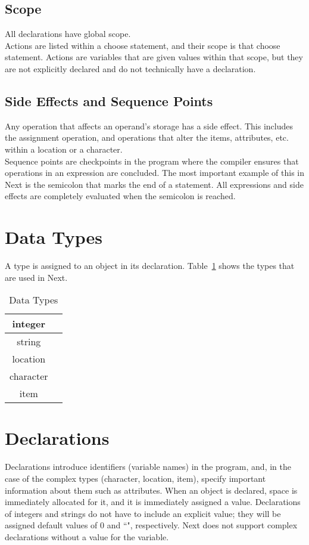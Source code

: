 \documentclass[12pt]{article}
\begin{document}
\subsection{Scope}
All declarations have global scope.   \\

\noindent Actions are listed within a choose statement, and their scope is that choose statement.  Actions are variables that are given values within that scope, but they are not explicitly declared and do not technically have a declaration.

\subsection{Side Effects and Sequence Points}
Any operation that affects an operand's storage has a side effect.  This includes the assignment operation, and operations that alter the items, attributes, etc. within a location or a character. \\

\noindent Sequence points are checkpoints in the program where the compiler ensures that operations in an expression are concluded.  The most important example of this in Next is the semicolon that marks the end of a statement.  All expressions and side effects are completely evaluated when the semicolon is reached.


\section{Data Types}
A type is assigned to an object in its declaration.  Table~\ref{types} shows the types that are used in Next.

\begin{table}[htdp]
\caption{Data Types}
\begin{center}
\begin{tabular}{|c|c|}
\hline
integer \\
\hline
string \\
\hline
location \\
\hline
character \\
\hline
item \\
\hline
\end{tabular}
\end{center}
\label{types}
\end{table}%

\section{Declarations}
Declarations introduce identifiers (variable names) in the program, and, in the case of the complex types (character, location, item), specify important information about them such as attributes.  When an object is declared, space is immediately allocated for it, and it is immediately assigned a value.  Declarations of integers and strings do not have to include an explicit value; they will be assigned default values of 0 and ``", respectively.  Next does not support complex declarations without a value for the variable.
\end{document}
